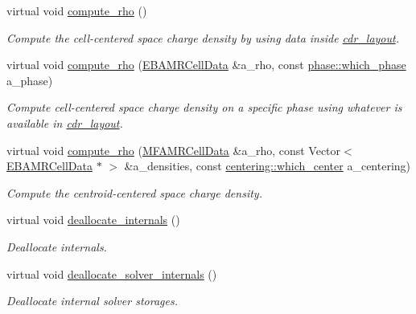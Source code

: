 \begin{DoxyCompactItemize}
virtual void \hyperlink{classtime__stepper_a8aff9e5ba857c3f49f719def02ebfc83}{compute\+\_\+rho} ()
\begin{DoxyCompactList}\small\item\em Compute the cell-\/centered space charge density by using data inside \hyperlink{classcdr__layout}{cdr\+\_\+layout}. \end{DoxyCompactList}\item 
virtual void \hyperlink{classtime__stepper_acfbcca9dd193580f3bed9dd43b1eabbc}{compute\+\_\+rho} (\hyperlink{type__definitions_8H_a7e610f301989e5e07781c5e338bdb7c3}{E\+B\+A\+M\+R\+Cell\+Data} \&a\+\_\+rho, const \hyperlink{namespacephase_a23c76f548a5eb1955ed8c929c541108b}{phase\+::which\+\_\+phase} a\+\_\+phase)
\begin{DoxyCompactList}\small\item\em Compute cell-\/centered space charge density on a specific phase using whatever is available in \hyperlink{classcdr__layout}{cdr\+\_\+layout}. \end{DoxyCompactList}\item 
virtual void \hyperlink{classtime__stepper_ae55e02489f3d7a1af414a0532278efa0}{compute\+\_\+rho} (\hyperlink{type__definitions_8H_aced885351d40daa466564acbee4042d3}{M\+F\+A\+M\+R\+Cell\+Data} \&a\+\_\+rho, const Vector$<$ \hyperlink{type__definitions_8H_a7e610f301989e5e07781c5e338bdb7c3}{E\+B\+A\+M\+R\+Cell\+Data} $\ast$ $>$ \&a\+\_\+densities, const \hyperlink{namespacecentering_a2cba3891fbdab30a214ce001478b0c00}{centering\+::which\+\_\+center} a\+\_\+centering)
\begin{DoxyCompactList}\small\item\em Compute the centroid-\/centered space charge density. \end{DoxyCompactList}\item 
virtual void \hyperlink{classtime__stepper_ae8c1849a79999d879aa243779efe013e}{deallocate\+\_\+internals} ()
\begin{DoxyCompactList}\small\item\em Deallocate internals. \end{DoxyCompactList}\item 
virtual void \hyperlink{classtime__stepper_a23ffd539aed706255765cfe14443195a}{deallocate\+\_\+solver\+\_\+internals} ()
\begin{DoxyCompactList}\small\item\em Deallocate internal solver storages. \end{DoxyCompactList}\item 

\end{DoxyCompactItemize}
